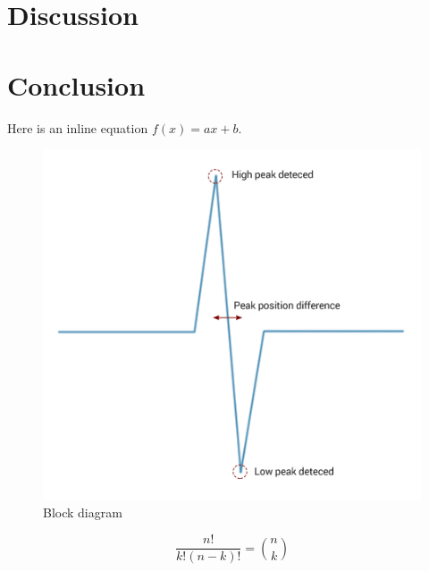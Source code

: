 
\section{Discussion} %
\label{sec:discussion}


\section{Conclusion} %
\label{sec:conclusion}




Here is an inline equation $f(x) = ax+b$. 

\begin{figure}[H]
\centering
\includegraphics[width = 300 pt]{Img/Figures.png}
\caption{Block diagram}
\label{fig:BlockDiagram}
\end{figure}

\begin{equation}
\frac{n!}{k!(n-k)!} = \binom{n}{k}
\label{eq: myequation}
\end{equation}